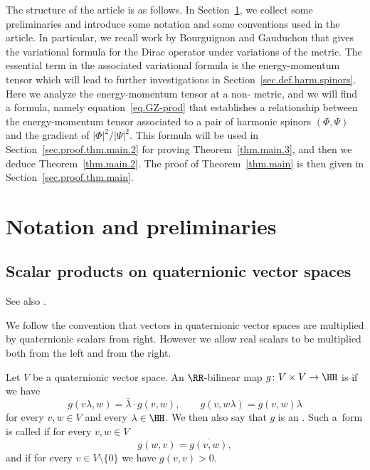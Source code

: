 The structure of the article is as follows. In Section~\ref{sec.prelim}, we collect some preliminaries and introduce some notation and some conventions used in the article. In particular, we recall work by Bourguignon and Gauduchon \cite{bourguignon.gauduchon:92} that gives the variational formula for the Dirac operator under variations of the metric. The essential term in the associated variational formula is the energy-momentum tensor which will lead to further investigations in Section~\ref{sec.def.harm.spinors}. Here we analyze the energy-momentum tensor at a non-\Dminimal{} metric, and we will find a formula, namely equation~\eqref{eq.GZ-prod} that establishes a relationship between the energy-momentum tensor associated to a pair of harmonic spinors $(\Phi,\Psi)$ and the gradient of $|\Phi|^2/|\Psi|^2$. This formula will be used in Section~\ref{sec.proof.thm.main.2} for proving Theorem~\ref{thm.main.3}, and then we deduce Theorem~\ref{thm.main.2}. The proof of Theorem~\ref{thm.main} is then given in Section~\ref{sec.proof.thm.main}.

\section{Notation and preliminaries}\label{sec.prelim}

\subsection{Scalar products on quaternionic vector spaces}

See also \cite[Chapter~2]{harvey:90}.

We follow the convention that vectors in quaternionic vector spaces are multiplied by quaternionic scalars from right. However we allow real scalars to be multiplied both from the left and from the right.

Let $V$ be a quaternionic vector space. An $\RR$-bilinear map $g\colon V\times V \to \HH$ is  if we have
\begin{equation*}
g(v\lambda,w)= \bar{\lambda} \cdot g(v,w),\qquad g(v,w\lambda)= g(v,w)\lambda
\end{equation*}
for every $v,w\in V$ and every $\lambda\in \HH$. We then also say that $g$ is an .
Such a~form is called  if for every $v,w\in V$
\begin{equation}\label{eq.HH.hermitian}
g(w,v)= \overline{g(v,w)},
\end{equation}
and  if for every $v\in V\setminus \{0\}$ we have $g(v,v)>0$.

